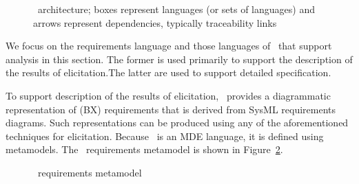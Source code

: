 \begin{figure}[htbp]
\caption{\transml\ architecture; boxes represent languages (or sets of languages) and arrows represent dependencies, typically traceability links}
\label{fig:transML}
\end{figure}

We focus on the requirements language and those languages of \transml\ that support analysis in this section. The former is used primarily to support the description of the results of elicitation.The latter are used to support detailed specification. 

To support description of the results of elicitation, \transml\ provides a diagrammatic representation of (BX) requirements that is derived from SysML requirements diagrams. Such representations can be produced using any of the aforementioned techniques for elicitation. Because \transml\ is an MDE language, it is defined using metamodels. The \transml\  requirements metamodel is shown in Figure~\ref{fig:transml-requirements}.

\begin{figure}[htbp]
\caption{\transml\ requirements metamodel}
\label{fig:transml-requirements}
\end{figure}

